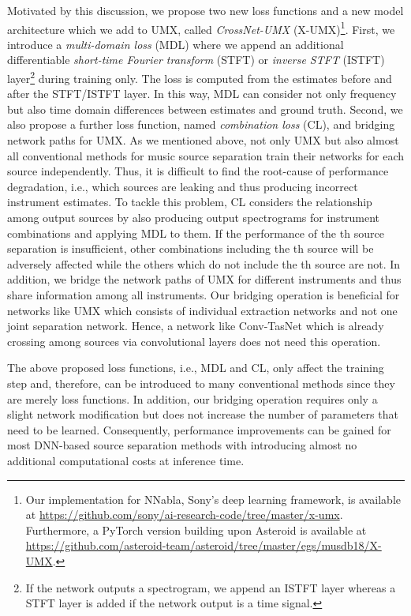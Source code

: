 \documentclass{article}
\begin{document}
Motivated by this discussion, we propose two new loss functions and a new model architecture which we add to UMX, called \emph{CrossNet-UMX} (X-UMX)\footnote{Our implementation for NNabla, Sony's deep learning framework, is available at \url{https://github.com/sony/ai-research-code/tree/master/x-umx}. 
Furthermore, a PyTorch version building upon Asteroid \cite{asteroid} is available at \url{https://github.com/asteroid-team/asteroid/tree/master/egs/musdb18/X-UMX}.}.
First, we introduce a \emph{multi-domain loss} (MDL) where we append an additional differentiable \emph{short-time Fourier transform} (STFT) or \emph{inverse STFT} (ISTFT) layer\footnote{If the network outputs a spectrogram, we append an ISTFT layer whereas a STFT layer is added if the network output is a time signal.} during training only. The loss is computed from the estimates before and after the STFT/ISTFT layer.
In this way, MDL can consider not only frequency but also time domain differences between estimates and ground truth.
Second, we also propose a further loss function, named \emph{combination loss} (CL), and bridging network paths for UMX.
As we mentioned above, not only UMX but also almost all conventional methods for music source separation train their networks for each source independently.
Thus, it is difficult to find the root-cause of performance degradation, i.e., which sources are leaking and thus producing incorrect instrument estimates.
To tackle this problem, CL considers the relationship among output sources by also producing output spectrograms for instrument combinations and applying MDL to them. 
If the performance of the th source separation is insufficient, other combinations including the th source will be adversely affected while the others which do not include the th source are not.
In addition, we bridge the network paths of UMX for different instruments and thus share information among all instruments. Our bridging operation is beneficial for networks like UMX which consists of individual extraction networks and not one joint separation network.
Hence, a network like Conv-TasNet which is already crossing among sources via convolutional layers does not need this operation.


The above proposed loss functions, i.e., MDL and CL, only affect the training step and, therefore, can be introduced to many conventional methods since they are merely loss functions.
In addition, our bridging operation requires only a slight network modification but does not increase the number of parameters that need to be learned.
Consequently, performance improvements can be gained for most DNN-based source separation methods with introducing almost no additional computational costs at inference time.
\end{document}
